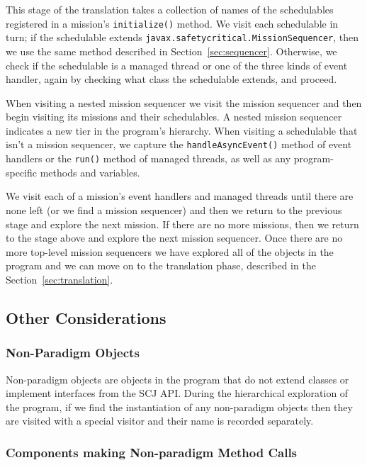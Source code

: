 \documentclass[10pt,a4paper]{article}
\begin{document}
This stage of the translation takes a collection of names of the schedulables registered in a mission's \texttt{initialize()} method. We visit each schedulable in turn; if the schedulable extends \texttt{javax.safetycritical.MissionSequencer}, then we use the same method described in Section~\ref{sec:sequencer}. Otherwise, we check if the schedulable is a managed thread or one of the three kinds of event handler, again by checking what class the schedulable extends, and proceed.


When visiting a nested mission sequencer we visit the mission sequencer and then begin visiting its missions and their schedulables. A nested mission sequencer indicates a new tier in the program's hierarchy. When visiting a schedulable that isn't a mission sequencer, we capture the \texttt{handleAsyncEvent()} method of event handlers or the \texttt{run()} method of managed threads, as well as any program-specific methods and variables. 

We visit each of a mission's event handlers and managed threads until there are none left (or we find a mission sequencer) and then we return to the previous stage and explore the next mission. If there are no more missions, then we return to the stage above and explore the next mission sequencer. Once there are no more top-level mission sequencers we have explored all of the objects in the program and we can move on to the translation phase, described in the Section~\ref{sec:translation}.

\subsection{Other Considerations}

\subsubsection{Non-Paradigm Objects}

Non-paradigm objects are objects in the program that do not extend classes or implement interfaces from the SCJ API. During the hierarchical exploration of the program, if we find the instantiation of any non-paradigm objects then they are visited with a special visitor and their name is recorded separately.

\subsubsection{Components making Non-paradigm Method Calls}
\end{document}
